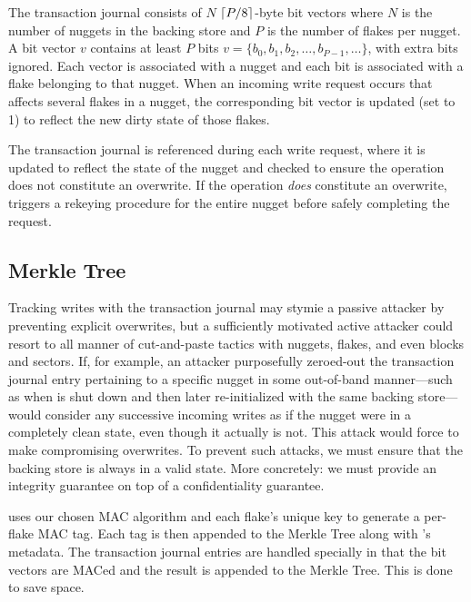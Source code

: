The transaction journal consists of $N$ $\lceil P / 8 \rceil$-byte bit
vectors where $N$ is the number of nuggets in the backing store and
$P$ is the number of flakes per nugget. A bit vector $v$ contains at
least $P$ bits $v = \{ b_0, b_1, b_2, \dots, b_{P-1}, \dots \}$, with
extra bits ignored. Each vector is associated with a nugget and each
bit is associated with a flake belonging to that nugget.  When an
incoming write request occurs that affects several flakes in a nugget,
the corresponding bit vector is updated (set to 1) to reflect the new
dirty state of those flakes.

The transaction journal is referenced during each write request, where
it is updated to reflect the state of the nugget and checked to ensure
the operation does not constitute an overwrite. If the operation
\textit{does} constitute an overwrite, \SYSTEM{} triggers a rekeying
procedure for the entire nugget before safely completing the request.

\subsection{Merkle Tree}

Tracking writes with the transaction journal may stymie a passive
attacker by preventing explicit overwrites, but a sufficiently
motivated active attacker could resort to all manner of cut-and-paste
tactics with nuggets, flakes, and even blocks and sectors. If, for
example, an attacker purposefully zeroed-out the transaction journal
entry pertaining to a specific nugget in some out-of-band
manner---such as when \SYSTEM{} is shut down and then later
re-initialized with the same backing store---\SYSTEM{} would consider
any successive incoming writes as if the nugget were in a completely
clean state, even though it actually is not. This attack would force
\SYSTEM{} to make compromising overwrites. To prevent such attacks, we
must ensure that the backing store is always in a valid state. More
concretely: we must provide an integrity guarantee on top of a
confidentiality guarantee.

\SYSTEM{} uses our chosen MAC algorithm and each flake's unique key to
generate a per-flake MAC tag. Each tag is then appended to the Merkle
Tree along with \SYSTEM{}'s metadata. The transaction journal entries
are handled specially in that the bit vectors are MACed and the result
is appended to the Merkle Tree.  This is done to save space.

